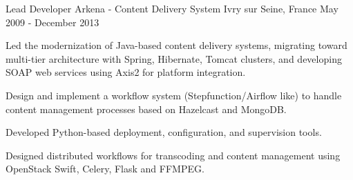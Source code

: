 \begin{cventries}
  \cventry
    {Lead Developer} %
    {Arkena - Content Delivery System} %
    {Ivry sur Seine, France} %
    {May 2009 - December 2013} %
    {
      \begin{cvitems} %
        \item {Led the modernization of Java-based content delivery systems, migrating toward multi-tier architecture with Spring, Hibernate, Tomcat clusters, and developing SOAP web services using Axis2 for platform integration.}
        \item {Design and implement a workflow system (Stepfunction/Airflow like) to handle content management processes based on Hazelcast and MongoDB.}
        \item {Developed Python-based deployment, configuration, and supervision tools.}
        \item {Designed distributed workflows for transcoding and content management using OpenStack Swift, Celery, Flask and FFMPEG.}
      \end{cvitems}
    }

\end{cventries}
